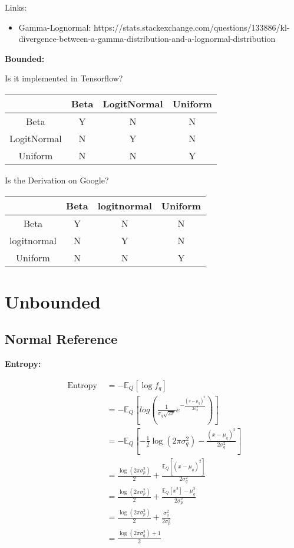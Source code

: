 \documentclass{article}
\begin{document}
Links:
\begin{itemize}
    \item Gamma-Lognormal: https://stats.stackexchange.com/questions/133886/kl-divergence-between-a-gamma-distribution-and-a-lognormal-distribution
\end{itemize}

\textbf{Bounded:}

Is it implemented in Tensorflow?

\begin{center}
\begin{tabular}{ c | c c c }
 & Beta & LogitNormal & Uniform \\
 \hline
 Beta & Y & N & N \\ 
 LogitNormal & N & Y & N \\  
 Uniform & N & N & Y    
\end{tabular}
\end{center}

Is the Derivation on Google?

\begin{center}
\begin{tabular}{ c | c c c }
 & Beta & logitnormal & Uniform \\
 \hline
 Beta & Y & N & N \\ 
 logitnormal & N & Y & N \\  
 Uniform & N & N & Y    
\end{tabular}
\end{center}



\section{Unbounded}

\subsection{Normal Reference}

\noindent \textbf{Entropy:}

$$ \begin{aligned} \text { Entropy }&=-\mathbb{E}_{Q}\left[\log f_{q}\right] \\ &=-\mathbb{E}_{Q}\left[log(\frac{1}{\sigma_{q} \sqrt{2 \pi}} e^{-\frac{(x-\mu_{q})^{2}}{2 \sigma_{q}^{2}}})\right] \\ &=-\mathbb{E}_{Q}\left[-\frac{1}{2} \log \left(2 \pi \sigma_{q}^{2}\right)-\frac{\left(x-\mu_{q}\right)^{2}}{2 \sigma_{q}^{2}}\right] \\ &=\frac{\log \left(2 \pi \sigma_{p}^{2}\right)}{2}+\frac{\mathbb{E}_{Q}\left[(x-\mu_{q})^2 \right]}{2 \sigma^2_{q}}\\ &=\frac{\log \left(2 \pi \sigma_{p}^{2}\right)}{2}+\frac{\mathbb{E}_{Q}\left[x^2 \right]-\mu_{q}^{2}}{2\sigma^2_{p}}\\ &=\frac{\log \left(2 \pi \sigma_{p}^{2}\right)}{2}+\frac{\sigma_{q}^{2}}{2\sigma^2_{p}}\\ &=\frac{\log \left(2 \pi \sigma_{q}^{2}\right)+1}{2} \end{aligned} $$
\end{document}
